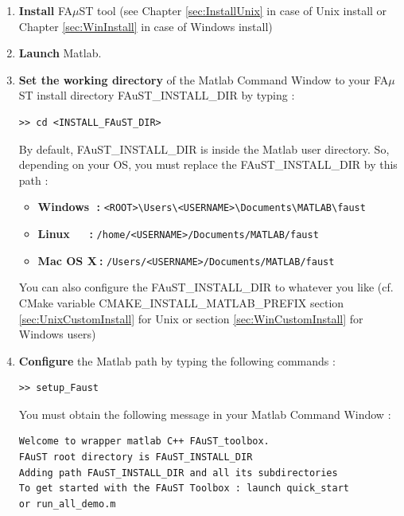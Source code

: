 \begin{enumerate}
	\item \textbf{Install} FA$\mu$ST tool (see Chapter \ref{sec:InstallUnix} in case of Unix install or Chapter \ref{sec:WinInstall} in case of Windows install)
	\item \textbf{Launch} Matlab.
	\item \textbf{Set the working directory} of the Matlab Command Window to your FA$\mu$ST install directory FAuST\_INSTALL\_DIR by typing :
		      	\begin{lstlisting}[style=customMatlab]
>> cd <INSTALL_FAuST_DIR>\end{lstlisting}	
	By default, FAuST\_INSTALL\_DIR is inside the Matlab user directory. So, depending on your OS, you must replace the FAuST\_INSTALL\_DIR by this path :
		\begin{itemize} 
			\item \textbf{Windows$\ \ \ $:} \texttt{<ROOT>\textbackslash Users\textbackslash <USERNAME>\textbackslash Documents\textbackslash MATLAB\textbackslash faust}
			\item \textbf{Linux$\ \ \ \ \ \ \ \ $:} \texttt{/home/<USERNAME>/Documents/MATLAB/faust}
			\item \textbf{Mac OS X$\ $:} \texttt{/Users/<USERNAME>/Documents/MATLAB/faust}
		\end{itemize}
	You can also configure the FAuST\_INSTALL\_DIR to whatever you like (cf. CMake variable CMAKE\_INSTALL\_MATLAB\_PREFIX section 		\ref{sec:UnixCustomInstall} for Unix or section \ref{sec:WinCustomInstall} for Windows users)
	



	\item \textbf{Configure} the Matlab path by typing the following commands :
	\lstset{style=customMatlab}
	\begin{lstlisting}
>> setup_Faust \end{lstlisting}
	You must obtain the following message in your Matlab Command Window : 
	\begin{lstlisting}
Welcome to wrapper matlab C++ FAuST_toolbox. 
FAuST root directory is FAuST_INSTALL_DIR
Adding path FAuST_INSTALL_DIR and all its subdirectories 
To get started with the FAuST Toolbox : launch quick_start 
or run_all_demo.m \end{lstlisting}

\end{enumerate}




